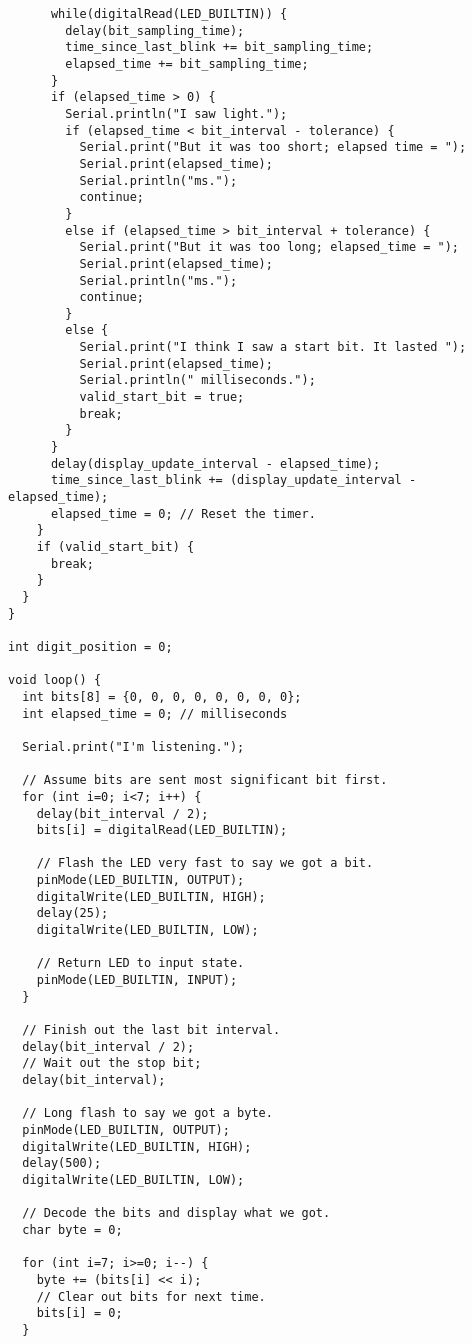 \documentclass[a4paper,notitlepage]{article}
\begin{document}
\begin{verbatim}
      while(digitalRead(LED_BUILTIN)) {
        delay(bit_sampling_time);
        time_since_last_blink += bit_sampling_time;
        elapsed_time += bit_sampling_time;
      }
      if (elapsed_time > 0) {
        Serial.println("I saw light.");
        if (elapsed_time < bit_interval - tolerance) {
          Serial.print("But it was too short; elapsed time = ");
          Serial.print(elapsed_time);
          Serial.println("ms.");
          continue;
        }
        else if (elapsed_time > bit_interval + tolerance) {
          Serial.print("But it was too long; elapsed_time = ");
          Serial.print(elapsed_time);
          Serial.println("ms.");
          continue;
        }
        else {
          Serial.print("I think I saw a start bit. It lasted ");
          Serial.print(elapsed_time);
          Serial.println(" milliseconds.");
          valid_start_bit = true;
          break;
        }
      }
      delay(display_update_interval - elapsed_time);
      time_since_last_blink += (display_update_interval - elapsed_time);
      elapsed_time = 0; // Reset the timer.
    }
    if (valid_start_bit) {
      break;
    }
  }
}

int digit_position = 0;

void loop() {
  int bits[8] = {0, 0, 0, 0, 0, 0, 0, 0};
  int elapsed_time = 0; // milliseconds

  Serial.print("I'm listening.");

  // Assume bits are sent most significant bit first.
  for (int i=0; i<7; i++) {
    delay(bit_interval / 2);
    bits[i] = digitalRead(LED_BUILTIN);

    // Flash the LED very fast to say we got a bit.
    pinMode(LED_BUILTIN, OUTPUT);
    digitalWrite(LED_BUILTIN, HIGH);
    delay(25);
    digitalWrite(LED_BUILTIN, LOW);

    // Return LED to input state.
    pinMode(LED_BUILTIN, INPUT);
  }

  // Finish out the last bit interval.
  delay(bit_interval / 2);
  // Wait out the stop bit;
  delay(bit_interval);

  // Long flash to say we got a byte.
  pinMode(LED_BUILTIN, OUTPUT);
  digitalWrite(LED_BUILTIN, HIGH);
  delay(500);
  digitalWrite(LED_BUILTIN, LOW);

  // Decode the bits and display what we got.
  char byte = 0;

  for (int i=7; i>=0; i--) {
    byte += (bits[i] << i);
    // Clear out bits for next time.
    bits[i] = 0;
  }


\end{verbatim}
\end{document}
